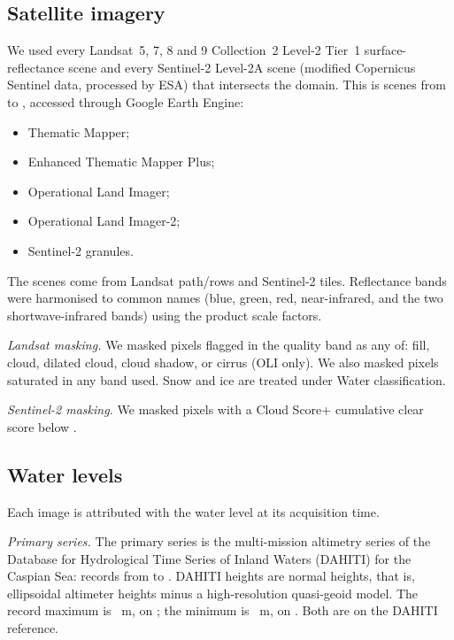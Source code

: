 \subsection*{Satellite imagery}
We used every Landsat~5, 7, 8 and 9 Collection~2 Level-2 Tier~1 surface-reflectance scene\citep{usgs_l45tm_c2l2,usgs_l7etm_c2l2,usgs_l89oli_c2l2} and every Sentinel-2 Level-2A scene (modified Copernicus Sentinel data, processed by ESA) that intersects the domain. This is  scenes from  to , accessed through Google Earth Engine:
\begin{itemize}
  \item {} Thematic Mapper;
  \item {} Enhanced Thematic Mapper Plus;
  \item {} Operational Land Imager;
  \item {} Operational Land Imager-2;
  \item {} Sentinel-2 granules.
\end{itemize}
The scenes come from  Landsat path/rows and  Sentinel-2 tiles. Reflectance bands were harmonised to common names (blue, green, red, near-infrared, and the two shortwave-infrared bands) using the product scale factors.

\emph{Landsat masking.} We masked pixels flagged in the quality band\citep{usgs_l45tm_c2l2,usgs_l7etm_c2l2,usgs_l89oli_c2l2} as any of: fill, cloud, dilated cloud, cloud shadow, or cirrus (OLI only). We also masked pixels saturated in any band used. Snow and ice are treated under Water classification.

\emph{Sentinel-2 masking.} We masked pixels with a Cloud Score+ cumulative clear score below \citep{pasquarella2023}.

\subsection*{Water levels}
Each image is attributed with the water level at its acquisition time.

\emph{Primary series.} The primary series is the multi-mission altimetry series of the Database for Hydrological Time Series of Inland Waters (DAHITI) for the Caspian Sea\citep{schwatke2015}:  records from  to . DAHITI heights are normal heights, that is, ellipsoidal altimeter heights minus a high-resolution quasi-geoid model\citep{schwatke2015}. The record maximum is ~m, on ; the minimum is ~m, on . Both are on the DAHITI reference.

